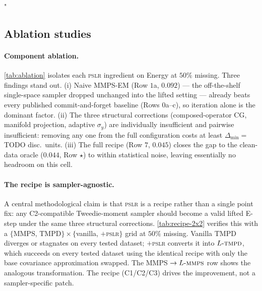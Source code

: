 "\documentclass{article}
\theoremstyle{plain}
\theoremstyle{definition}
\theoremstyle{remark}
\newcommand{\pslr}{\textsc{pslr}}
\newcommand{\lmmps}{L\mbox{-}\textsc{mmps}}
\newcommand{\ltmpd}{L\mbox{-}\textsc{tmpd}}
\begin{document}
\vspace{-1mm}
\subsection{Ablation studies}
\label{sec:ablation}
\vspace{-1mm}

\paragraph{Component ablation.}
\cref{tab:ablation} isolates each \pslr{} ingredient on Energy at $50\%$ missing. Three findings stand out. (i) Naive MMPS-EM (Row $1$a, $0.092$) --- the off-the-shelf single-space sampler dropped unchanged into the lifted setting --- already beats every published commit-and-forget baseline (Rows $0$a--c), so iteration alone is the dominant factor. (ii) The three structural corrections (composed-operator CG, manifold projection, adaptive $\sigma_y$) are individually insufficient and pairwise insufficient: removing any one from the full configuration costs at least $\Delta_{\min} = $ TODO disc.\ units. (iii) The full recipe (Row $7$, $0.045$) closes the gap to the clean-data oracle ($0.044$, Row $\star$) to within statistical noise, leaving essentially no headroom on this cell.

\paragraph{The recipe is sampler-agnostic.}
A central methodological claim is that \pslr{} is a recipe rather than a single point fix: any C2-compatible Tweedie-moment sampler should become a valid lifted E-step under the same three structural corrections. \cref{tab:recipe-2x2} verifies this with a $\{$MMPS, TMPD$\} \times \{$vanilla, $+$\pslr{}$\}$ grid at $50\%$ missing. Vanilla TMPD diverges or stagnates on every tested dataset; $+$\pslr{} converts it into $\ltmpd$, which succeeds on every tested dataset using the identical recipe with only the base covariance approximation swapped. The MMPS $\to \lmmps$ row shows the analogous transformation. The recipe (C1/C2/C3) drives the improvement, not a sampler-specific patch.
\end{document}
